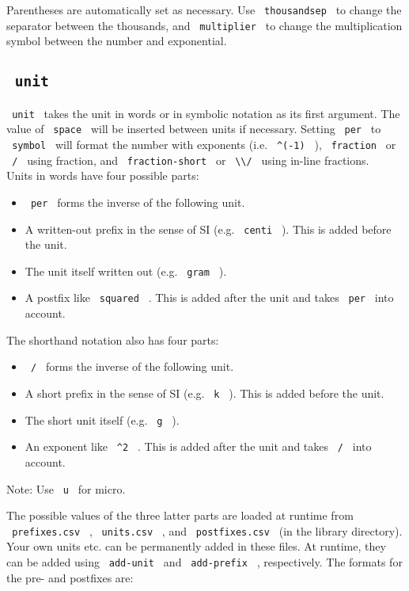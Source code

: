 Parentheses are automatically set as necessary. Use
\texttt{\ thousandsep\ } to change the separator between the thousands,
and \texttt{\ multiplier\ } to change the multiplication symbol between
the number and exponential.

\subsection{\texorpdfstring{\texttt{\ unit\ }}{ unit }}\label{unit}

\texttt{\ unit\ } takes the unit in words or in symbolic notation as its
first argument. The value of \texttt{\ space\ } will be inserted between
units if necessary. Setting \texttt{\ per\ } to \texttt{\ symbol\ } will
format the number with exponents (i.e. \texttt{\ \^{}(-1)\ } ),
\texttt{\ fraction\ } or \texttt{\ /\ } using fraction, and
\texttt{\ fraction-short\ } or
\texttt{\ \textbackslash{}\textbackslash{}/\ } using in-line
fractions.\\
Units in words have four possible parts:

\begin{itemize}
\tightlist
\item
  \texttt{\ per\ } forms the inverse of the following unit.
\item
  A written-out prefix in the sense of SI (e.g. \texttt{\ centi\ } ).
  This is added before the unit.
\item
  The unit itself written out (e.g. \texttt{\ gram\ } ).
\item
  A postfix like \texttt{\ squared\ } . This is added after the unit and
  takes \texttt{\ per\ } into account.
\end{itemize}

The shorthand notation also has four parts:

\begin{itemize}
\tightlist
\item
  \texttt{\ /\ } forms the inverse of the following unit.
\item
  A short prefix in the sense of SI (e.g. \texttt{\ k\ } ). This is
  added before the unit.
\item
  The short unit itself (e.g. \texttt{\ g\ } ).
\item
  An exponent like \texttt{\ \^{}2\ } . This is added after the unit and
  takes \texttt{\ /\ } into account.
\end{itemize}

Note: Use \texttt{\ u\ } for micro.

The possible values of the three latter parts are loaded at runtime from
\texttt{\ prefixes.csv\ } , \texttt{\ units.csv\ } , and
\texttt{\ postfixes.csv\ } (in the library directory). Your own units
etc. can be permanently added in these files. At runtime, they can be
added using \texttt{\ add-unit\ } and \texttt{\ add-prefix\ } ,
respectively. The formats for the pre- and postfixes are:

